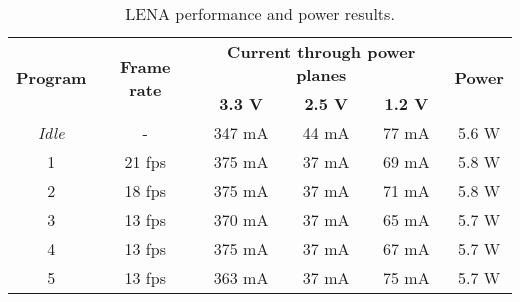 \begin{table}[h!]
\centering
\begin{tabular}{c|c|ccc|c}
	\multirow{2}{*}{\textbf{Program}} &
        \multirow{2}{*}{\textbf{Frame rate}} &
        \multicolumn{3}{c|}{\textbf{Current through power planes}} &
        \multirow{2}{*}{\textbf{Power}} \\
        & &
        \textbf{3.3 V} &
        \textbf{2.5 V} &
        \textbf{1.2 V} & \\
	\hline
	\emph{Idle} & - & 347 mA & 44 mA & 77 mA & 5.6 W \\
	1 & 21 fps & 375 mA & 37 mA & 69 mA & 5.8 W \\
        2 & 18 fps & 375 mA & 37 mA & 71 mA & 5.8 W \\
        3 & 13 fps & 370 mA & 37 mA & 65 mA & 5.7 W \\
        4 & 13 fps & 375 mA & 37 mA & 67 mA & 5.7 W \\
        5 & 13 fps & 363 mA & 37 mA & 75 mA & 5.7 W \\
\end{tabular}
\caption[LENA results]{LENA performance and power results.}
\label{tab:lena-benchmark-table}
\end{table}
